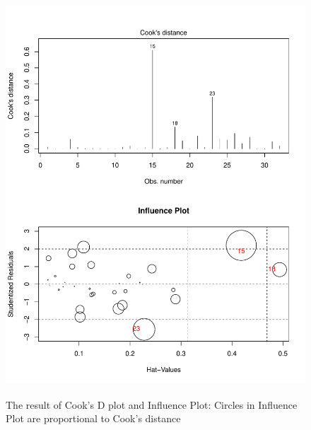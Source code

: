 \documentclass[12pt]{article} %
\begin{document}
\begin{enumerate}
\begin{itemize}
\begin{figure}[!ht]
\begin{center}
 \includegraphics[height=15cm]{plot1}
\end{center}
\caption{The result of Cook's D plot and Influence Plot: Circles in Influence Plot are proportional to Cook's distance\label{inflplot}}
\end{figure}	
	\end{itemize}		
\end{enumerate}
\end{document}
